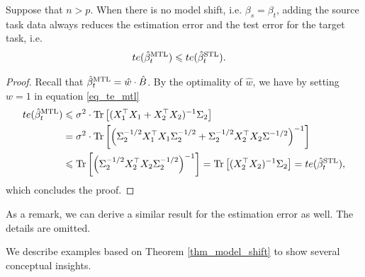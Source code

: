 \begin{proposition}\label{prop_monotone}
	Suppose that $n > p$.
  When there is no model shift, i.e. $\beta_s = \beta_t$, adding the source task data always reduces the estimation error and the test error for the target task, i.e.
	\begin{align}
		te(\hat{\beta}_{t}^{\text{MTL}}) &\leqslant te(\hat{\beta}_t^{\text{STL}}). \label{eq_mono_te}
	\end{align}
\end{proposition}

\begin{proof}
	Recall that $\hat{\beta}_t^{\text{MTL}} = \hat{w} \cdot \hat{B}$.
	By the optimality of $\hat{w}$, we have by setting $w = 1$ in equation \eqref{eq_te_mtl}
	\begin{align*}
		te(\hat{\beta}_t^{\text{MTL}}) &\leqslant \sigma^2 \cdot \operatorname{Tr}\left[(X_1^{\top}X_1 + X_2^{\top}X_2)^{-1}\Sigma_2\right] \\
		&= \sigma^2 \cdot \operatorname{Tr}\left[\left({\Sigma_2^{-1/2}X_1^{\top}X_1\Sigma_2^{-1/2} + \Sigma_2^{-1/2}X_2^{\top}X_2\Sigma^{-1/2}}\right)^{-1}\right] \\
		&\leqslant \operatorname{Tr}\left[\left({\Sigma_2^{-1/2}X_2^{\top}X_2\Sigma_2^{-1/2}}\right)^{-1}\right]
			= \operatorname{Tr}\left[(X_2^{\top}X_2)^{-1} \Sigma_2\right] = te(\hat{\beta}_t^{\text{STL}}),
	\end{align*}
	which concludes the proof.
\end{proof}

As a remark, we can derive a similar result for the estimation error as well. The details are omitted.


We describe examples based on Theorem \ref{thm_model_shift} to show several conceptual insights.

